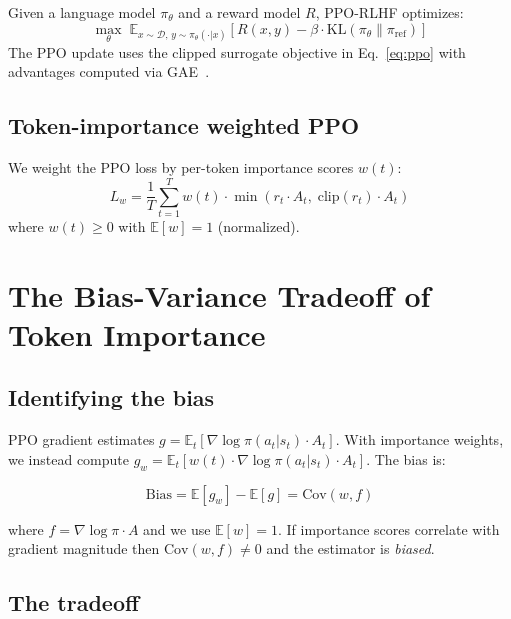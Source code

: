 \documentclass[11pt,a4paper]{article}
\begin{document}
Given a language model $\pi_\theta$ and a reward model $R$, PPO-RLHF optimizes:
\begin{equation}
\max_\theta \; \mathbb{E}_{x \sim \mathcal{D},\, y \sim \pi_\theta(\cdot|x)} \!\left[ R(x, y) - \beta \cdot \text{KL}(\pi_\theta \| \pi_{\text{ref}}) \right]
\end{equation}
The PPO update uses the clipped surrogate objective in Eq.~\eqref{eq:ppo} with advantages computed via GAE~\citep{schulman2016gae}.

\subsection{Token-importance weighted PPO}

We weight the PPO loss by per-token importance scores $w(t)$:
\begin{equation}
\label{eq:weighted-ppo}
L_w = \frac{1}{T} \sum_{t=1}^{T} w(t) \cdot \min\!\left(r_t \cdot A_t,\; \text{clip}(r_t) \cdot A_t\right)
\end{equation}
where $w(t) \geq 0$ with $\mathbb{E}[w] = 1$ (normalized).

\section{The Bias-Variance Tradeoff of Token Importance}
\label{sec:bias-variance}

\subsection{Identifying the bias}

PPO gradient estimates $g = \mathbb{E}_t[\nabla \log \pi(a_t|s_t) \cdot A_t]$. With importance weights, we instead compute $g_w = \mathbb{E}_t[w(t) \cdot \nabla \log \pi(a_t|s_t) \cdot A_t]$. The bias is:

\begin{equation}
\label{eq:bias}
\text{Bias} = \mathbb{E}[g_w] - \mathbb{E}[g] = \text{Cov}(w, f)
\end{equation}

where $f = \nabla \log \pi \cdot A$ and we use $\mathbb{E}[w] = 1$. If importance scores correlate with gradient magnitude then $\text{Cov}(w, f) \neq 0$ and the estimator is \emph{biased}.

\subsection{The tradeoff}
\end{document}
